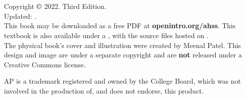 \chapter*{}

\vfill


Copyright $\copyright$ 2022. Third Edition. \\
Updated: \versiondate. \\

\noindent%
This book may be downloaded as a free PDF at
    {\color{black}\textbf{openintro.org/ahss}}.
This textbook is also available under a
,
with the source files hosted on
. \\

\noindent%
The physical book's cover and illustration were created by Meenal Patel.
This design and image are under a separate copyright and are \textbf{not}
released under a Creative Commons license. \\


\printlocation



\noindent%
AP\textregistered{} is a trademark registered and owned by the College Board, which was not involved in the production of, and does not endorse, this product.
